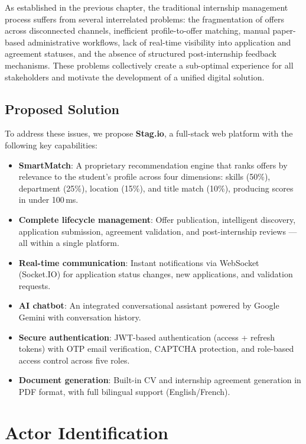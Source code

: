 As established in the previous chapter, the traditional internship management process suffers from several interrelated problems: the fragmentation of offers across disconnected channels, inefficient profile-to-offer matching, manual paper-based administrative workflows, lack of real-time visibility into application and agreement statuses, and the absence of structured post-internship feedback mechanisms. These problems collectively create a sub-optimal experience for all stakeholders and motivate the development of a unified digital solution.

\subsection{Proposed Solution}

To address these issues, we propose \textbf{Stag.io}, a full-stack web platform with the following key capabilities:

\begin{itemize}
    \item \textbf{SmartMatch}: A proprietary recommendation engine that ranks offers by relevance to the student's profile across four dimensions: skills (50\%), department (25\%), location (15\%), and title match (10\%), producing scores in under 100\,ms.
    \item \textbf{Complete lifecycle management}: Offer publication, intelligent discovery, application submission, agreement validation, and post-internship reviews --- all within a single platform.
    \item \textbf{Real-time communication}: Instant notifications via WebSocket (Socket.IO) for application status changes, new applications, and validation requests.
    \item \textbf{AI chatbot}: An integrated conversational assistant powered by Google Gemini with conversation history.
    \item \textbf{Secure authentication}: JWT-based authentication (access + refresh tokens) with OTP email verification, CAPTCHA protection, and role-based access control across five roles.
    \item \textbf{Document generation}: Built-in CV and internship agreement generation in PDF format, with full bilingual support (English/French).
\end{itemize}

\section{Actor Identification}

